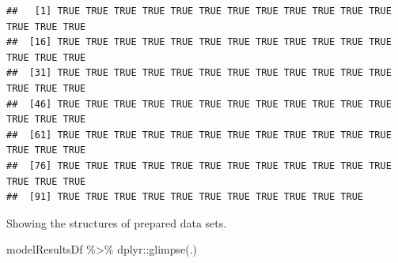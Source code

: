 \documentclass[
]{article}
\newenvironment{Shaded}{\begin{snugshade}}{\end{snugshade}}
\newcommand{\AttributeTok}[1]{\textcolor[rgb]{0.77,0.63,0.00}{#1}}
\newcommand{\CommentTok}[1]{\textcolor[rgb]{0.56,0.35,0.01}{\textit{#1}}}
\newcommand{\ConstantTok}[1]{\textcolor[rgb]{0.00,0.00,0.00}{#1}}
\newcommand{\DecValTok}[1]{\textcolor[rgb]{0.00,0.00,0.81}{#1}}
\newcommand{\FunctionTok}[1]{\textcolor[rgb]{0.00,0.00,0.00}{#1}}
\newcommand{\NormalTok}[1]{#1}
\newcommand{\OtherTok}[1]{\textcolor[rgb]{0.56,0.35,0.01}{#1}}
\newcommand{\SpecialCharTok}[1]{\textcolor[rgb]{0.00,0.00,0.00}{#1}}
\newcommand{\StringTok}[1]{\textcolor[rgb]{0.31,0.60,0.02}{#1}}
\begin{document}
\begin{Shaded}
\end{Shaded}

\begin{verbatim}
##   [1] TRUE TRUE TRUE TRUE TRUE TRUE TRUE TRUE TRUE TRUE TRUE TRUE TRUE TRUE TRUE
##  [16] TRUE TRUE TRUE TRUE TRUE TRUE TRUE TRUE TRUE TRUE TRUE TRUE TRUE TRUE TRUE
##  [31] TRUE TRUE TRUE TRUE TRUE TRUE TRUE TRUE TRUE TRUE TRUE TRUE TRUE TRUE TRUE
##  [46] TRUE TRUE TRUE TRUE TRUE TRUE TRUE TRUE TRUE TRUE TRUE TRUE TRUE TRUE TRUE
##  [61] TRUE TRUE TRUE TRUE TRUE TRUE TRUE TRUE TRUE TRUE TRUE TRUE TRUE TRUE TRUE
##  [76] TRUE TRUE TRUE TRUE TRUE TRUE TRUE TRUE TRUE TRUE TRUE TRUE TRUE TRUE TRUE
##  [91] TRUE TRUE TRUE TRUE TRUE TRUE TRUE TRUE TRUE TRUE TRUE
\end{verbatim}

Showing the structures of prepared data sets.

\begin{Shaded}
\begin{Highlighting}[]
\NormalTok{modelResultsDf }\SpecialCharTok{\%\textgreater{}\%}\NormalTok{  dplyr}\SpecialCharTok{::}\FunctionTok{glimpse}\NormalTok{(.)}
\end{Highlighting}
\end{Shaded}
\end{document}
